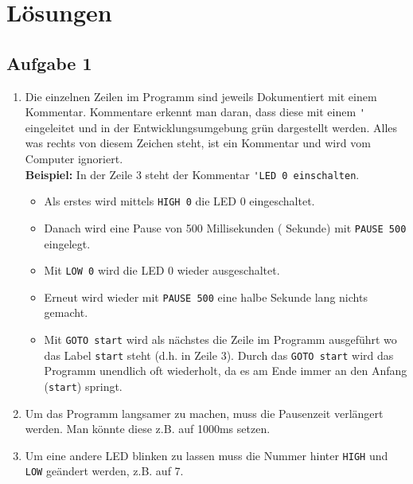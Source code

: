 
\section{Lösungen}


\ifteacher
\subsection{Aufgabe 1}
\begin{enumerate}[label=(\alph*)]
	\item Die einzelnen Zeilen im Programm sind jeweils Dokumentiert
	mit einem Kommentar. Kommentare erkennt man daran, dass diese mit
	einem \lstinline{'} eingeleitet und in der Entwicklungsumgebung
	grün dargestellt werden. Alles was rechts von diesem 
	Zeichen steht, ist ein Kommentar und wird vom Computer ignoriert.\\
	\textbf{Beispiel:} In der Zeile 3 steht der Kommentar 
	\lstinline{'LED 0 einschalten}.
	\begin{itemize}
		\item Als erstes wird mittels \lstinline{HIGH 0} die LED 0 
		eingeschaltet.
		\item Danach wird eine Pause von 500 Millisekunden 
		( Sekunde) mit \lstinline{PAUSE 500} eingelegt.
		\item Mit \lstinline{LOW 0} wird die LED 0 wieder ausgeschaltet.
		\item Erneut wird wieder mit \lstinline{PAUSE 500} eine halbe
		Sekunde lang nichts gemacht.
		\item Mit \lstinline{GOTO start} wird als nächstes die Zeile
		im Programm ausgeführt wo das Label \lstinline{start} steht
		(d.h. in Zeile 3). Durch das \lstinline{GOTO start} wird das
		Programm unendlich oft wiederholt, da es am Ende immer an den
		Anfang (\lstinline{start}) springt.
	\end{itemize}
	\item Um das Programm langsamer zu machen, muss die Pausenzeit
	verlängert werden. Man könnte diese z.B. auf 1000ms setzen.
	
	\item Um eine andere LED blinken zu lassen muss die Nummer hinter 
	\lstinline{HIGH} und \lstinline{LOW} geändert werden, z.B. auf 7.
	
\end{enumerate}
\fi

\ifteacher
\newpage
